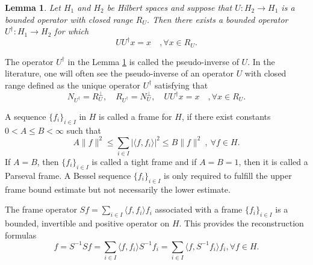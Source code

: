 \documentclass[11pt]{amsart}
\newtheorem{lem}[thm]{Lemma}
\theoremstyle{definition}
\theoremstyle{remark}
\numberwithin{equation}{section}
\begin{document}
\begin{lem}\label{111}\cite{ole}
Let $H_1$ and $H_2$ be Hilbert spaces and suppose that $U : H_2\to H_1$
is a bounded operator with closed range $R_U$. Then there exists a bounded
operator $U^\dagger :H_1\to H_2$ for which $$ UU^\dagger x=x\quad,\forall x\in R_U.$$
\end{lem}
The operator $U^\dagger$ in the  Lemma \ref{111} is called the
pseudo-inverse of $U$. In the literature, one will often see the pseudo-inverse
of an operator $U$ with closed range defined as the unique operator $U^\dagger$
satisfying that
$$
N_{U^\dagger}=R_U^\perp,\quad R_{U^\dagger}=N_U^\perp,\quad UU^\dagger x=x\quad,\forall x\in R_U.
$$\par
A sequence $\{f_i\}_{i\in I}$ in $H$ is called a frame for $H$, if  there exist constants $0<A\le B<\infty$ such that
\[A\|f\|^2\le\sum_{i\in I}|\langle f,f_i\rangle|^2\le B\|f\|^2\ ,\ \forall f\in H.\]
If $A=B$, then $\{f_i\}_{i\in I}$ is called a tight frame and if $A=B=1$, then it is called a Parseval frame.
A Bessel sequence  $\{f_i\}_{i\in I}$ is only required to fulfill the upper frame bound estimate but not necessarily the lower estimate.

The frame operator $Sf=\sum_{i\in I}\langle f,f_i\rangle f_i$ associated with a frame $\{f_i\}_{i\in I}$ is a bounded, invertible and positive operator on $H$. This provides the reconstruction formulas
\[f=S^{-1}Sf=\sum_{i\in I}\langle f,f_i\rangle S^{-1}f_i=\sum_{i\in I}\langle f,S^{-1}f_i\rangle f_i,\forall f\in H.\]
\end{document}
